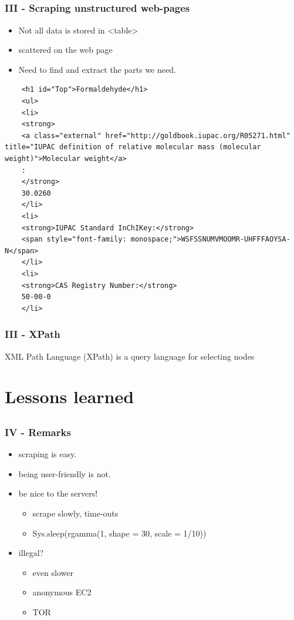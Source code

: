 \documentclass[12pt, t]{beamer}
\begin{document}
\subsection{}
\begin{frame}[fragile]
\frametitle{III - Scraping unstructured web-pages}
\begin{itemize}
	\item Not all data is stored in <table>
	\item scattered on the web page
	\item Need to find and extract the parts we need.
\end{itemize}

	\begin{verbatim}
	<h1 id="Top">Formaldehyde</h1>
	<ul>
	<li>
	<strong>
	<a class="external" href="http://goldbook.iupac.org/R05271.html" title="IUPAC definition of relative molecular mass (molecular weight)">Molecular weight</a>
	:
	</strong>
	30.0260
	</li>
	<li>
	<strong>IUPAC Standard InChIKey:</strong>
	<span style="font-family: monospace;">WSFSSNUMVMOOMR-UHFFFAOYSA-N</span>
	</li>
	<li>
	<strong>CAS Registry Number:</strong>
	50-00-0
	</li>
	\end{verbatim}
\end{frame}


\begin{frame}[fragile]
\frametitle{III - XPath}
XML Path Language (XPath) is a query language for selecting nodes

\end{frame}




\section{Lessons learned}
\subsection{}
\begin{frame}
\frametitle{IV - Remarks}
\begin{itemize}
	\item scraping is easy.
	\item being user-friendly is \textcolor{hilight}{not}.
	\item be nice to the servers!
	\begin{itemize}
		\item scrape slowly, time-outs
		\item Sys.sleep(rgamma(1, shape = 30, scale = 1/10))
	\end{itemize}
	\item illegal?
	\begin{itemize}
		\item even slower
		\item anonymous EC2
		\item TOR
	\end{itemize}
\end{itemize}

\end{frame}
\end{document}
